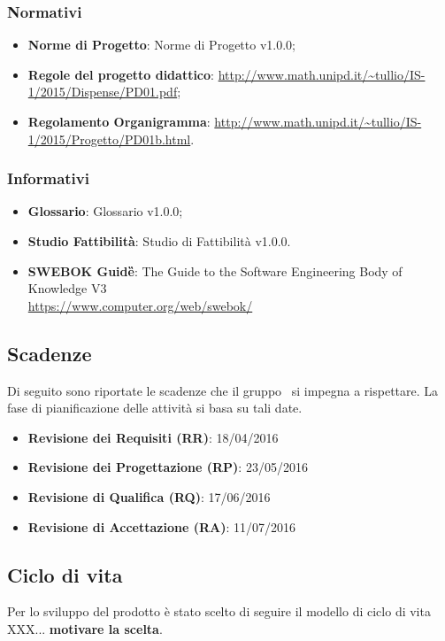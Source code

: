 \subsubsection{Normativi}
\begin{itemize}
\item \textbf{Norme di Progetto}: Norme di Progetto v1.0.0;
\item \textbf{Regole del progetto didattico}: \url{http://www.math.unipd.it/~tullio/IS-1/2015/Dispense/PD01.pdf};
\item \textbf{Regolamento Organigramma}: \url{http://www.math.unipd.it/~tullio/IS-1/2015/Progetto/PD01b.html}.
\end{itemize}

\subsubsection{Informativi}
\begin{itemize}
\item \textbf{Glossario}: Glossario v1.0.0;
\item \textbf{Studio Fattibilità}: Studio di Fattibilità v1.0.0.
\item \textbf{SWEBOK Guide\G}: The Guide to the Software Engineering Body of Knowledge V3 \\ \url{https://www.computer.org/web/swebok/}
\end{itemize}
 

\subsection{Scadenze}
Di seguito sono riportate le scadenze che il gruppo \GRUPPO\ si impegna a rispettare. La fase di pianificazione delle attività si basa su tali date.
\begin{itemize}
\item \textbf{Revisione dei Requisiti (RR)}: 18/04/2016
\item \textbf{Revisione dei Progettazione (RP)}: 23/05/2016
\item \textbf{Revisione di Qualifica (RQ)}: 17/06/2016
\item \textbf{Revisione di Accettazione (RA)}:  11/07/2016
\end{itemize}

\subsection{Ciclo di vita}
Per lo sviluppo del prodotto è stato scelto di seguire il modello di ciclo di vita XXX...
\textbf{motivare la scelta}.
